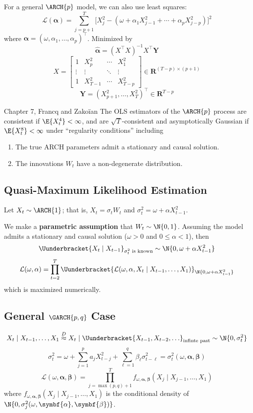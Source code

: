 For a general $ \ARCH{p} $ model, we can also use least squares:
\[ \mathcal{L}(\symbf{\alpha})=\sum_{j=p+1}^{T} \bigl[X_j^2-(\omega+\alpha_1 X_{j-1}^2+\cdots+\alpha_p X_{j-p}^2)\bigr]^2 \]
where $ \symbf{\alpha}=(\omega,\alpha_1,\ldots,\alpha_p)^\top $. Minimized by
\[ \hat{\symbf{\alpha}}=(X^\top X)^{-1}X^\top \symbf{Y} \]
\[ X=\begin{bmatrix}
        1      & X_p^2     & \cdots & X_1^2     \\
        \vdots & \vdots    & \ddots & \vdots    \\
        1      & X_{T-1}^2 & \cdots & X_{T-p}^2
    \end{bmatrix}\in\mathbf{R}^{(T-p)\times (p+1)} \]
\[ \symbf{Y}=(X_{p+1}^2,\ldots,X_T^2)^\top \in\mathbf{R}^{T-p} \]
\begin{Theorem}{Chapter 7, Francq and Zakoïan}{}
    The OLS estimators of the $ \ARCH{p} $ process are
    consistent if $ \E{X_t^4}<\infty $, and are $ \sqrt{T} $-consistent
    and asymptotically Gaussian if $ \E{X_t^8}<\infty $ under
    ``regularity conditions'' including
    \begin{enumerate}[(1)]
        \item The true ARCH parameters admit a stationary and causal solution.
        \item The innovations $ W_t $ have a non-degenerate distribution.
    \end{enumerate}
\end{Theorem}
\subsection*{Quasi-Maximum Likelihood Estimation}
Let $ X_t \sim \ARCH{1} $; that is, $ X_t=\sigma_t W_t $ and $ \sigma_t^2=\omega+\alpha X_{t-1}^2 $.

We make a \textbf{parametric assumption} that $ W_t \sim \N{0,1} $. Assuming the model
admits a stationary and causal solution ($ \omega>0 $ and $ 0\le \alpha<1 $), then
\[ \Uunderbracket{X_t\mid X_{t-1}}_{\sigma_t^2\text{ is known}} \sim \N{0,\omega+\alpha X_{t-1}^2} \]
\[ \mathcal{L}(\omega,\alpha)=\prod_{t=2}^T \Uunderbracket{\mathcal{L}(\omega,\alpha, X_t\mid X_{t-1},\ldots,X_1)}_{\N{0,\omega+\alpha X_{t-1}^2}} \]
which is maximized numerically.

\subsection*{General $ \GARCH{p,q} $ Case}
\[ X_t\mid X_{t-1},\ldots,X_1 \stackrel{D}{\approx} X_t\mid \Uunderbracket{X_{t-1},X_{t-2},\ldots}_{\text{infinte past}} \sim \N{0,\sigma_t^2} \]
\[ \sigma_t^2=\omega+\sum_{j=1}^{p} a_j X_{t-j}^2+\sum_{\ell=1}^{q} \beta_\ell \sigma_{t-\ell}^2=\sigma_t^2(\omega,\symbf{\alpha},\symbf{\beta}) \]
\[ \mathcal{L}(\omega,\symbf{\alpha},\symbf{\beta})=
    \prod_{j=\max(p,q)+1}^T f_{\omega,\symbf{\alpha},\symbf{\beta}}(X_j\mid X_{j-1},\ldots,X_1) \]
where $ f_{\omega,\symbf{\alpha},\symbf{\beta}}(X_j\mid X_{j-1},\ldots,X_1) $ is the conditional density of
$ \N{0,\sigma_j^2(\omega,\symbf{\alpha},\symbf{\beta})} $.

